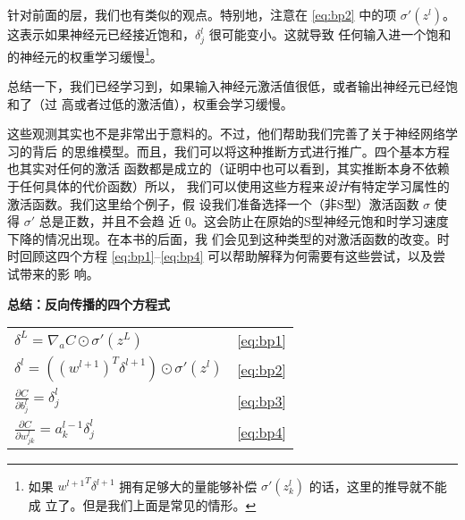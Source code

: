 针对前面的层，我们也有类似的观点。特别地，注意在 \eqref{eq:bp2} 中的项
$\sigma'(z^l)$。这表示如果神经元已经接近饱和，$\delta_j^l$ 很可能变小。这就导致
任何输入进一个饱和的神经元的权重学习缓慢\footnote{如果 ${w^{l+1}}^T
  \delta^{l+1}$ 拥有足够大的量能够补偿 $\sigma'(z_k^l)$ 的话，这里的推导就不能成
  立了。但是我们上面是常见的情形。}。

总结一下，我们已经学习到，如果输入神经元激活值很低，或者输出神经元已经饱和了（过
  高或者过低的激活值），权重会学习缓慢。

这些观测其实也不是非常出于意料的。不过，他们帮助我们完善了关于神经网络学习的背后
的思维模型。而且，我们可以将这种推断方式进行推广。四个基本方程也其实对任何的激活
函数都是成立的（证明中也可以看到，其实推断本身不依赖于任何具体的代价函数）所以，
我们可以使用这些方程来\emph{设计}有特定学习属性的激活函数。我们这里给个例子，假
设我们准备选择一个（非S型）激活函数 $\sigma$ 使得 $\sigma'$ 总是正数，并且不会趋
近 $0$。这会防止在原始的S型神经元饱和时学习速度下降的情况出现。在本书的后面，我
们会见到这种类型的对激活函数的改变。时时回顾这四个方程
\eqref{eq:bp1}--\eqref{eq:bp4} 可以帮助解释为何需要有这些尝试，以及尝试带来的影
响。

\begin{center}
  \begin{minipage}{0.7\textwidth}
    \begin{framed}
      \centering
      \textbf{总结：反向传播的四个方程式}\label{backpropsummary}\\
      \vspace{1.5ex}
      \begin{tabular}{ll}
        $\delta^L = \nabla_a C \odot \sigma'(z^L)$            & \hspace{2cm}\eqref{eq:bp1} \\[1.5ex]
        $\delta^l = ((w^{l+1})^T \delta^{l+1}) \odot \sigma'(z^l)$ & \hspace{2cm}\eqref{eq:bp2} \\[1.5ex]
        $\frac{\partial C}{\partial b^l_j} = \delta^l_j$       & \hspace{2cm}\eqref{eq:bp3} \\[1.5ex]
        $\frac{\partial C}{\partial w^l_{jk}} = a^{l-1}_k \delta^l_j$ & \hspace{2cm}\eqref{eq:bp4}
      \end{tabular}
    \end{framed}
  \end{minipage}
\end{center}

